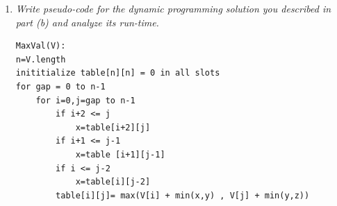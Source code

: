 \documentclass[12pt]{article}
\begin{document}
\begin{enumerate}
\begin{enumerate}
\begin{center}
\begin{tabular}{||c c c c c||}
\end{tabular}
\end{center}
	
	\item\textit{ Write pseudo-code for the dynamic programming solution you described in part (b) and analyze its run-time.}
	
\begin{small}
\begin{verbatim}
MaxVal(V):
n=V.length
inititialize table[n][n] = 0 in all slots
for gap = 0 to n-1
    for i=0,j=gap to n-1
        if i+2 <= j
            x=table[i+2][j]
        if i+1 <= j-1
            x=table [i+1][j-1]
        if i <= j-2
            x=table[i][j-2]
        table[i][j]= max(V[i] + min(x,y) , V[j] + min(y,z))
\end{verbatim}
\end{small}
	\end{enumerate}

\end{enumerate}
\end{document}
